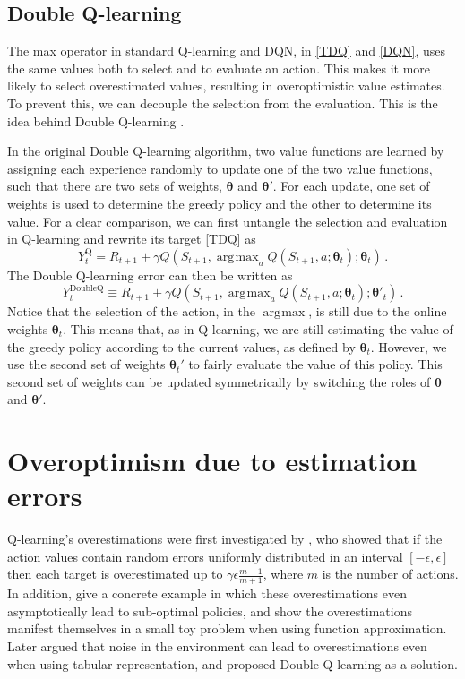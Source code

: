 \documentclass[letterpaper]{article}
\def\th{\bm\theta}
\def\g{\gamma}
\DeclareMathOperator*{\argmax}{\arg\!\max}
\begin{document}
\subsection{Double Q-learning} The max operator in standard Q-learning and DQN, in \eqref{TDQ} and \eqref{DQN}, uses the same values both to select and to evaluate an action.  This makes it more likely to select overestimated values, resulting in overoptimistic value estimates.
To prevent this, we can decouple the selection from the evaluation.  This is the idea behind Double Q-learning \citep{vanHasselt:2010}.

In the original Double Q-learning algorithm, two value functions are learned by assigning each experience randomly to update one of the two value functions, such that there are two sets of weights, $\th$ and $\th'$.  For each update, one set of weights is used to determine the greedy policy and the other to determine its value.
For a clear comparison, we can first untangle the selection and evaluation in Q-learning and rewrite its target \eqref{TDQ} as
\[
Y^{\text{Q}}_t = R_{t+1} + \g Q(S_{t+1}, \argmax_a Q(S_{t+1}, a; \th_t); \th_t ) \,.
\]
The Double Q-learning error can then be written as
\begin{equation}\label{TDDQ}
Y^{\text{DoubleQ}}_t \!\equiv R_{t+1} + \g Q(S_{t+1}, \argmax_a Q(S_{t+1}, a; \th_t); \th'_t ) \,.
\end{equation}
Notice that the selection of the action, in the $\argmax$, is still due to the online weights $\th_t$.  This means that, as in Q-learning, we are still estimating the value of the greedy policy according to the current values, as defined by $\th_t$.  However, we use the second set of weights $\th_t'$ to fairly evaluate the value of this policy.  This second set of weights can be updated symmetrically by switching the roles of $\th$ and $\th'$.


\section{Overoptimism due to estimation errors}
\label{sec:learningoverest}

Q-learning's overestimations were first investigated by \citet{Thrun:1993}, who showed that if the action values contain random errors uniformly distributed in an interval $[-\epsilon,\epsilon]$ then each target is overestimated up to $\g \epsilon \frac{m-1}{m+1}$, where $m$ is the number of actions.  In addition, \citeauthor{Thrun:1993} give a concrete example in which these overestimations even asymptotically lead to sub-optimal policies, and show the overestimations manifest themselves in a small toy problem when using function approximation.
Later \citet{vanHasselt:2010} argued that noise in the environment can lead to overestimations even when using tabular representation, and proposed Double Q-learning as a solution.
\end{document}
